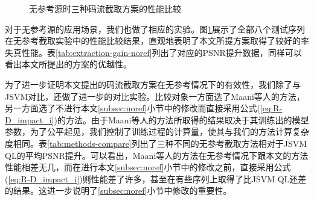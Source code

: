 \begin{figure}[!ht]
	\qquad
	\caption{无参考源时三种码流截取方案的性能比较}
	\label{fig:extraction-performance-noref}
\end{figure}

对于无参考源的应用场景，我们也做了相应的实验。图\ref{fig:extraction-performance-noref}展示了全部八个测试序列在无参考截取实验中的性能比较结果，直观地表明了本文所提方案取得了较好的率失真性能。表\ref{tab:extraction-gain-noref}列出了对应的PSNR提升数据，同样可以看出本文所提出的方案的优越性。

为了进一步证明本文提出的码流截取方案在无参考情况下的有效性，我们除了与JSVM对比，还做了进一步的对比实验。比较对象一方面选了Maani等人的方法\supercite{Maani2009}，另一方面选了不进行本文\ref{subsec:noref}小节中的修改而直接采用公式(\ref{eq:R-D_impact_i})的方法。由于Maani等人的方法所取得的结果取决于其训练出的模型参数，为了公平起见，我们控制了训练过程的计算量，使其与我们的方法计算复杂度相同。表\ref{tab:methods-compare}列出了三种不同的无参考截取方法相对于JSVM QL的平均PSNR提升。可以看出，Maani等人的方法在无参考情况下跟本文的方法性能相差无几，而在进行本文\ref{subsec:noref}小节中的修改之前，直接采用公式(\ref{eq:R-D_impact_i})则性能差了许多，甚至在有些序列上取得了比JSVM QL还差的结果。这进一步说明了\ref{subsec:noref}小节中修改的重要性。

